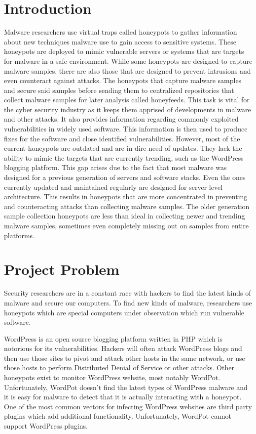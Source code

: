 \documentclass[10pt,conference,draftclsnofoot,onecolumn]{IEEEtran}
\begin{document}
\section{Introduction}
Malware researchers use virtual traps called honeypots to gather information about new techniques malware use to gain access to sensitive systems. These honeypots are deployed to mimic vulnerable servers or systems that are targets for malware in a safe environment. While some honeypots are designed to capture malware samples, there are also those that are designed to prevent intrusions and even counteract against attacks. The honeypots that capture malware samples and secure said samples before sending them to centralized repositories that collect malware samples for later analysis called honeyfeeds. This task is vital for the cyber security industry as it keeps them apprised of developments in malware and other attacks. It also provides information regarding commonly exploited vulnerabilities in widely used software. This information is then used to produce fixes for the software and close identified vulnerabilities. However, most of the current honeypots are outdated and are in dire need of updates. They lack the ability to mimic the targets that are currently trending, such as the WordPress blogging platform. This gap arises due to the fact that most malware was designed for a previous generation of servers and software stacks. Even the ones currently updated and maintained regularly are designed for server level architecture. This results in honeypots that are more concentrated in preventing and counteracting attacks than collecting malware samples. The older generation sample collection honeypots are less than ideal in collecting newer and trending malware samples, sometimes even completely missing out on samples from entire platforms. 

\section{Project Problem}
Security researchers are in a constant race with hackers to find the latest kinds of malware and secure our computers. To find new kinds of malware, researchers use honeypots which are special computers under observation which run vulnerable software.

WordPress is an open source blogging platform written in PHP which is notorious for its vulnerabilities. Hackers will often attack WordPress blogs and then use those sites to pivot and attack other hosts in the same network, or use those hosts to perform Distributed Denial of Service or other attacks. Other honeypots exist to monitor WordPress website, most notably WordPot. Unfortunately, WordPot doesn’t find the latest types of WordPress malware and it is easy for malware to detect that it is actually interacting with a honeypot. One of the most common vectors for infecting WordPress websites are third party plugins which add additional functionality. Unfortunately, WordPot cannot support WordPress plugins.
\end{document}
